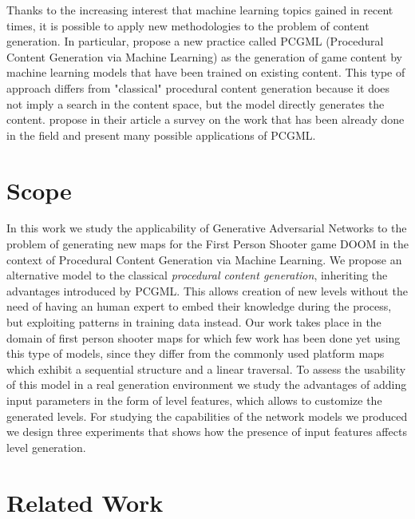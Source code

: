 Thanks to the increasing interest that machine learning topics gained in recent times, it is possible to apply new methodologies to the problem of content generation. In particular, \citeauthor{PCGML} propose a new practice called PCGML (Procedural Content Generation via Machine Learning) \cite{PCGML} as the generation of game content by machine learning models that have been trained on existing content. This type of approach differs from "classical" procedural content generation because it does not imply a search in the content space, but the model directly generates the content.  \citeauthor{PCGML} propose in their article a survey on the work that has been already done in the field and present many possible applications of PCGML.


\section{Scope}
\label{sec:scope}
In this work we study the applicability of Generative Adversarial Networks to the problem of generating new maps for the First Person Shooter game DOOM in the context of Procedural Content Generation via Machine Learning. We propose an alternative model to the classical \textit{procedural content generation}, inheriting the advantages introduced by PCGML. This allows creation of new levels without the need of having an human expert to embed their knowledge during the process, but exploiting patterns in training data instead. Our work takes place in the domain of first person shooter maps for which few work has been done yet using this type of models, since they differ from the commonly used platform maps which exhibit a sequential structure and a linear traversal. To assess the usability of this model in a real generation environment we study the advantages of adding input parameters in the form of level features, which allows to customize the generated levels. For studying the capabilities of the network models we produced we design three experiments that shows how the presence of input features affects level generation. 

\section{Related Work}
\label{sec:relatedwork}

